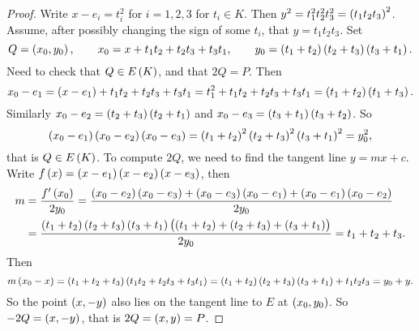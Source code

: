 \begin{proof}
Write $ x - e_i = t_i^2 $ for $ i = 1, 2, 3 $ for $ t_i \in K $. Then $ y^2 = t_1^2t_2^2t_3^2 = \br{t_1t_2t_3}^2 $. Assume, after possibly changing the sign of some $ t_i $, that $ y = t_1t_2t_3 $. Set
$$ Q = \br{x_0, y_0}, \qquad x_0 = x + t_1t_2 + t_2t_3 + t_3t_1, \qquad y_0 = \br{t_1 + t_2}\br{t_2 + t_3}\br{t_3 + t_1}. $$
Need to check that $ Q \in E\br{K} $, and that $ 2Q = P $. Then
$$ x_0 - e_1 = \br{x - e_1} + t_1t_2 + t_2t_3 + t_3t_1 = t_1^2 + t_1t_2 + t_2t_3 + t_3t_1 = \br{t_1 + t_2}\br{t_1 + t_3}. $$
Similarly $ x_0 - e_2 = \br{t_2 + t_3}\br{t_2 + t_1} $ and $ x_0 - e_3 = \br{t_3 + t_1}\br{t_3 + t_2} $. So
$$ \br{x_0 - e_1}\br{x_0 - e_2}\br{x_0 - e_3} = \br{t_1 + t_2}^2\br{t_2 + t_3}^2\br{t_3 + t_1}^2 = y_0^2, $$
that is $ Q \in E\br{K} $. To compute $ 2Q $, we need to find the tangent line $ y = mx + c $. Write $ f\br{x} = \br{x - e_1}\br{x - e_2}\br{x - e_3} $, then
\begin{align*}
m
& = \dfrac{f'\br{x_0}}{2y_0}
= \dfrac{\br{x_0 - e_2}\br{x_0 - e_3} + \br{x_0 - e_3}\br{x_0 - e_1} + \br{x_0 - e_1}\br{x_0 - e_2}}{2y_0} \\
& = \dfrac{\br{t_1 + t_2}\br{t_2 + t_3}\br{t_3 + t_1}\br{\br{t_1 + t_2} + \br{t_2 + t_3} + \br{t_3 + t_1}}}{2y_0}
= t_1 + t_2 + t_3.
\end{align*}
Then
$$ m\br{x_0 - x} = \br{t_1 + t_2 + t_3}\br{t_1t_2 + t_2t_3 + t_3t_1} = \br{t_1 + t_2}\br{t_2 + t_3}\br{t_3 + t_1} + t_1t_2t_3 = y_0 + y. $$
So the point $ \br{x, -y} $ also lies on the tangent line to $ E $ at $ \br{x_0, y_0} $. So $ -2Q = \br{x, -y} $, that is $ 2Q = \br{x, y} = P $.
\end{proof}


